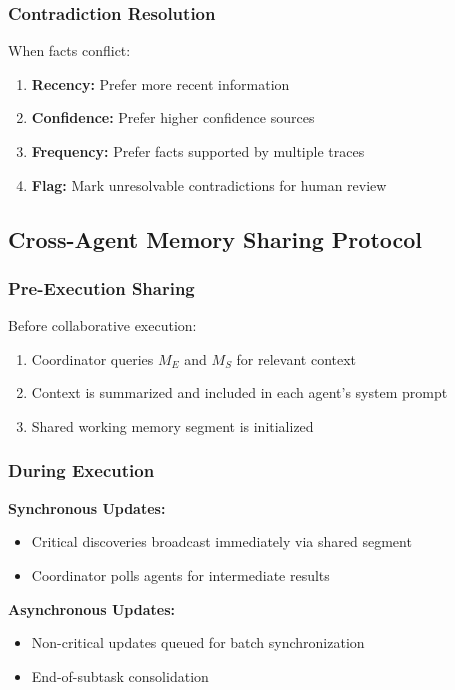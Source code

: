 \documentclass{article}
\theoremstyle{plain}
\theoremstyle{definition}
\theoremstyle{remark}
\begin{document}
\subsubsection{Contradiction Resolution}

When facts conflict:
\begin{enumerate}
	\item \textbf{Recency:} Prefer more recent information
	\item \textbf{Confidence:} Prefer higher confidence sources
	\item \textbf{Frequency:} Prefer facts supported by multiple traces
	\item \textbf{Flag:} Mark unresolvable contradictions for human review
\end{enumerate}

\subsection{Cross-Agent Memory Sharing Protocol}
\label{sec:uma_sharing}

\subsubsection{Pre-Execution Sharing}

Before collaborative execution:
\begin{enumerate}
	\item Coordinator queries $M_E$ and $M_S$ for relevant context
	\item Context is summarized and included in each agent's system prompt
	\item Shared working memory segment is initialized
\end{enumerate}

\subsubsection{During Execution}

\textbf{Synchronous Updates:}
\begin{itemize}
	\item Critical discoveries broadcast immediately via shared segment
	\item Coordinator polls agents for intermediate results
\end{itemize}

\textbf{Asynchronous Updates:}
\begin{itemize}
	\item Non-critical updates queued for batch synchronization
	\item End-of-subtask consolidation
\end{itemize}
\end{document}

